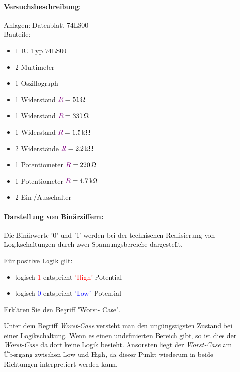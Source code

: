 \documentclass[11pt,a4paper,titlepage]{scrreprt}
\begin{document}
	
  \tableofcontents


      \paragraph{Versuchsbeschreibung:}
        Anlagen: Datenblatt 74LS00\\
        Bauteile:
        \begin{itemize}
          \setlength\itemsep{-1em}
          \item 1 IC Typ 74LS00
          \item 2 Multimeter
          \item 1 Oszillograph
          \item 1 Widerstand $\textcolor{violet}{R} = \SI{51}{\ohm}$
          \item 1 Widerstand $\textcolor{violet}{R} = \SI{330}{\ohm}$
          \item 1 Widerstand $\textcolor{violet}{R} = \SI{1,5}{\kilo\ohm}$
          \item 2 Widerstände $\textcolor{violet}{R} = \SI{2,2}{\kilo\ohm}$
          \item 1 Potentiometer $\textcolor{violet}{R} = \SI{220}{\ohm}$
          \item 1 Potentiometer $\textcolor{violet}{R} = \SI{4,7}{\kilo\ohm}$
          \item 2 Ein-/Ausschalter
        \end{itemize}
    
      \paragraph{Darstellung von Binärziffern:} Die Binärwerte '0' und '1' werden bei der technischen Realisierung von Logikschaltungen durch zwei Spannungsbereiche dargestellt.
    
        Für positive Logik gilt:
        \begin{itemize}
          \setlength\itemsep{-1em}
          \item logisch \textcolor{red}{1} entspricht \textcolor{red}{'High'}-Potential
          \item logisch \textcolor{blue}{0} entspricht \textcolor{blue}{'Low'}–Potential
        \end{itemize}
    
        Erklären Sie den Begriff "Worst- Case".
    
        Unter dem Begriff \textit{Worst-Case} versteht man den ungüngstigsten Zustand bei einer Logikschaltung. Wenn es einen undefinierten Bereich gibt, so ist dies der \textit{Worst-Case} da dort keine Logik besteht. Ansonsten liegt der \textit{Worst-Case} am Übergang zwischen Low und High, da dieser Punkt wiederum in beide Richtungen interpretiert werden kann.
\end{document}
